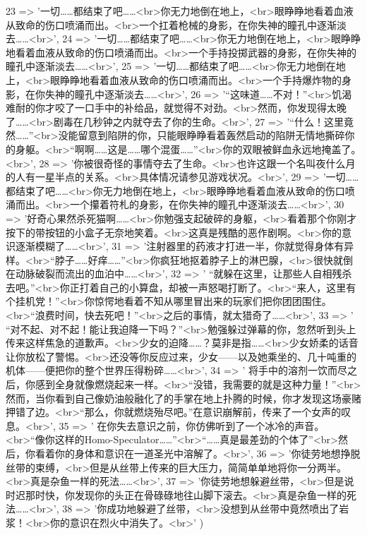 \begin{DoxyCode}
    23 => \textcolor{stringliteral}{'一切……都结束了吧……<br>你无力地倒在地上，<br>眼睁睁地看着血液从致命的伤口喷涌而出。<br>一个扛着枪械的身影，在你失神的瞳孔中逐渐淡去……<br>'},
    24 => \textcolor{stringliteral}{'一切……都结束了吧……<br>你无力地倒在地上，<br>眼睁睁地看着血液从致命的伤口喷涌而出。<br>一个手持投掷武器的身影，在你失神的瞳孔中逐渐淡去……<br>'},
    25 => \textcolor{stringliteral}{'一切……都结束了吧……<br>你无力地倒在地上，<br>眼睁睁地看着血液从致命的伤口喷涌而出。<br>一个手持爆炸物的身影，在你失神的瞳孔中逐渐淡去……<br>'},
    26 => \textcolor{stringliteral}{'“这味道……不对！”<br>饥渴难耐的你才咬了一口手中的补给品，就觉得不对劲。<br>然而，你发现得太晚了……<br>剧毒在几秒钟之内就夺去了你的生命。<br>'},
    27 => \textcolor{stringliteral}{'“什么！这里竟然……”<br>没能留意到陷阱的你，只能眼睁睁看着轰然启动的陷阱无情地撕碎你的身躯。<br>“啊啊……这是……哪个混蛋……”<br>你的双眼被鲜血永远地掩盖了。<br>'},
    28 => \textcolor{stringliteral}{'你被很奇怪的事情夺去了生命。<br>也许这跟一个名叫夜什么月的人有一星半点的关系。<br>具体情况请参见游戏状况。<br>'},
    29 => \textcolor{stringliteral}{'一切……都结束了吧……<br>你无力地倒在地上，<br>眼睁睁地看着血液从致命的伤口喷涌而出。<br>一个攥着符札的身影，在你失神的瞳孔中逐渐淡去……<br>'},
    30 => \textcolor{stringliteral}{'好奇心果然杀死猫啊……<br>你勉强支起破碎的身躯，<br>看着那个你刚才按下的带按钮的小盒子无奈地笑着。<br>这真是残酷的恶作剧啊。<br>你的意识逐渐模糊了……<br>'},
    31 => \textcolor{stringliteral}{'注射器里的药液才打进一半，你就觉得身体有异样。<br>“脖子……好痒……”<br>你疯狂地抠着脖子上的淋巴腺，<br>很快就倒在动脉破裂而流出的血泊中……<br>'},
    32 => \textcolor{stringliteral}{'
      “就躲在这里，让那些人自相残杀去吧。”<br>你正打着自己的小算盘，却被一声怒喝打断了。<br>“来人，这里有个挂机党！”<br>你惊愕地看着不知从哪里冒出来的玩家们把你团团围住。<br>“浪费时间，快去死吧！”<br>之后的事情，就太猎奇了……<br>'},
    33 => \textcolor{stringliteral}{'
      “对不起、对不起！能让我迫降一下吗？”<br>勉强躲过弹幕的你，忽然听到头上传来这样焦急的道歉声。<br>少女的迫降……？莫非是指……<br>少女娇柔的话音让你放松了警惕。<br>还没等你反应过来，少女——以及她乘坐的、几十吨重的机体——便把你的整个世界压得粉碎……<br>'},
    34 => \textcolor{stringliteral}{'
      将手中的溶剂一饮而尽之后，你感到全身就像燃烧起来一样。<br>“没错，我需要的就是这种力量！”<br>然而，当你看到自己像奶油般融化了的手掌在地上扑腾的时候，你才发现这场豪赌押错了边。<br>“那么，你就燃烧殆尽吧。”在意识崩解前，传来了一个女声的叹息。<br>'},
    35 => \textcolor{stringliteral}{'
      在你失去意识之前，你仿佛听到了一个冰冷的声音。<br>“像你这样的Homo-Speculator……”<br>“……真是最差劲的个体了”<br>然后，你看着你的身体和意识在一道圣光中溶解了。<br>'},
    36 => \textcolor{stringliteral}{'你徒劳地想挣脱丝带的束缚，<br>但是从丝带上传来的巨大压力，简简单单地将你一分两半。<br>真是杂鱼一样的死法……<br>'},
    37 => \textcolor{stringliteral}{'你徒劳地想躲避丝带，<br>但是说时迟那时快，你发现你的头正在骨碌碌地往山脚下滚去。<br>真是杂鱼一样的死法……<br>'},
    38 => \textcolor{stringliteral}{'你成功地躲避了丝带，<br>没想到从丝带中竟然喷出了岩浆！<br>你的意识在烈火中消失了。<br>'}
)
\end{DoxyCode}


